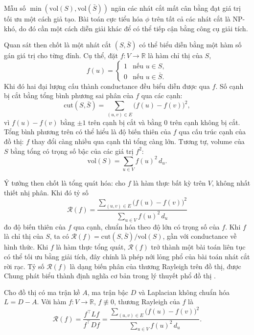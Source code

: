 Mẫu số $\min(\mathrm{vol}(S), \mathrm{vol}(\bar{S}))$ ngăn các nhát cắt mất cân bằng đạt giá trị tối ưu một cách giả tạo. Bài toán cực tiểu hóa $\phi$ trên tất cả các nhát cắt là NP-khó, do đó cần một cách diễn giải khác để có thể tiếp cận bằng công cụ giải tích.

Quan sát then chốt là một nhát cắt $(S, \bar S)$ có thể biểu diễn bằng một hàm số gán giá trị cho từng đỉnh. Cụ thể, đặt $f: V \to \mathbb{R}$ là hàm chỉ thị của $S$,
\[
    f(u) = \begin{cases} 1 & \text{nếu } u \in S, \\ 0 & \text{nếu } u \in \bar{S}. \end{cases}
\]
Khi đó hai đại lượng cấu thành conductance đều biểu diễn được qua $f$. Số cạnh bị cắt bằng tổng bình phương sai phân của $f$ qua các cạnh:
\[
    \mathrm{cut}(S, \bar{S}) = \sum_{(u,v) \in E} \bigl( f(u) - f(v) \bigr)^2,
\]
vì $f(u) - f(v)$ bằng $\pm 1$ trên cạnh bị cắt và bằng $0$ trên cạnh không bị cắt. Tổng bình phương trên có thể hiểu là độ biến thiên của $f$ qua cấu trúc cạnh của đồ thị: $f$ thay đổi càng nhiều qua cạnh thì tổng càng lớn. Tương tự, volume của $S$ bằng tổng có trọng số bậc của các giá trị $f^2$:
\[
    \mathrm{vol}(S) = \sum_{u \in V} f(u)^2 \, d_u.
\]

Ý tưởng then chốt là tổng quát hóa: cho $f$ là hàm thực bất kỳ trên $V$, không nhất thiết nhị phân. Khi đó tỷ số
\[
    \mathcal{R}(f) = \frac{\sum_{(u,v) \in E} \bigl( f(u) - f(v) \bigr)^2}{\sum_{u \in V} f(u)^2 \, d_u}
\]
đo độ biến thiên của $f$ qua cạnh, chuẩn hóa theo độ lớn có trọng số của $f$. Khi $f$ là chỉ thị của $S$, ta có $\mathcal{R}(f) = \mathrm{cut}(S, \bar{S}) / \mathrm{vol}(S)$, gần với conductance về hình thức. Khi $f$ là hàm thực tổng quát, $\mathcal{R}(f)$ trở thành một bài toán liên tục có thể tối ưu bằng giải tích, đây chính là phép nới lỏng phổ của bài toán nhát cắt rời rạc. Tỷ số $\mathcal{R}(f)$ là dạng biến phân của thương Rayleigh trên đồ thị, được Chung phát biểu thành định nghĩa cơ bản trong lý thuyết phổ đồ thị \cite{chung1997}.

\begin{definition}
\label{def:rayleigh-graph}
Cho đồ thị có ma trận kề $A$, ma trận bậc $D$ và Laplacian không chuẩn hóa $L = D - A$. Với hàm $f: V \to \mathbb{R}$, $f \not\equiv 0$, thương Rayleigh của $f$ là
\[
    \mathcal{R}(f) = \frac{f^\top L f}{f^\top D f}
                  = \frac{\sum_{(u,v) \in E} \bigl( f(u) - f(v) \bigr)^2}{\sum_{u \in V} f(u)^2 \, d_u}.
\]
\end{definition}

